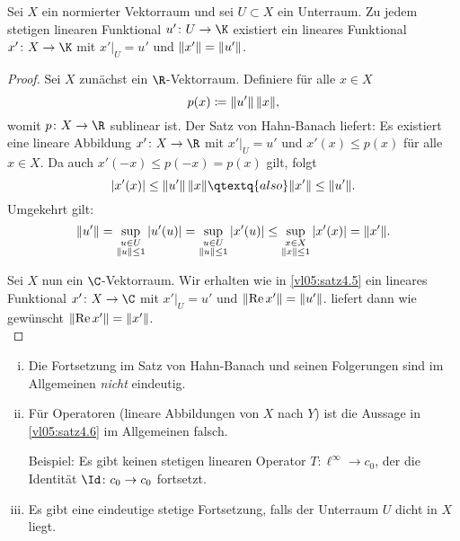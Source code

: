 \begin{thSatz} \label{vl05:satz4.6}
    Sei $X$ ein normierter Vektorraum und sei $U\subset X$ ein Unterraum. Zu
    jedem stetigen linearen Funktional $u'\colon U\to\K$ existiert ein lineares
    Funktional $x'\colon X\to\K$ mit $x'\vert_U = u'$ und $\lVert x'\rVert=\lVert u'\rVert$.
\end{thSatz}

\begin{proof}
    Sei $X$ zunächst ein $\R$-Vektorraum. Definiere für alle $x\in X$
    \[ p(x) \defeq \norm*{u'} \, \norm{x}  , \]
    womit $p\colon X\to\R$ sublinear ist. Der Satz von Hahn-Banach
     liefert: Es existiert eine lineare Abbildung
    $x'\colon X\to\R$ mit $x'\vert_U = u'$ und $x'(x) \leq p(x)$ für alle
    $x\in X$. Da auch $x'(-x) \leq p(-x) = p(x)$ gilt, folgt
    \[ \abs*{x'(x)}\leq \norm*{u'} \, \norm{x}  \qtextq{also}
        \norm*{x'}\leq\norm*{u'}
    . \]
    Umgekehrt gilt:
    \[ \norm*{u'} = \sup_{\substack{u\in U\\\norm{u}\leq1}} \, \abs*{u'(u)}
        = \sup_{\substack{u\in U\\\norm{u}\leq1}}           \, \abs*{x'(u)}
        \leq \sup_{\substack{x\in X\\\norm{x}\leq1}}        \, \abs*{x'(x)}
        = \norm*{x'}
    . \]
    
    Sei $X$ nun ein $\C$-Vektorraum. Wir erhalten wie in \cref{vl05:satz4.5}
    ein lineares Funktional $x'\colon X\to\C$ mit $x'\vert_U = u'$ und 
    $\norm*{\Re x'} = \norm*{u'}$.  liefert dann
    wie gewünscht $\norm*{\Re x'} = \norm*{x'}$.
    \\
\end{proof}

\begin{thBemerkung}\hfill
    \begin{enumerate}[i)]
        \item
            Die Fortsetzung im Satz von Hahn-Banach 
            und seinen Folgerungen sind im Allgemeinen \emph{nicht} eindeutig.
        \item
            Für Operatoren (lineare Abbildungen von $X$ nach $Y$) ist die
            Aussage in \cref{vl05:satz4.6} im Allgemeinen falsch.
            
            Beispiel: Es gibt keinen stetigen linearen Operator
            $T\colon\ell^\infty\to c_0$, der die Identität $\Id\colon c_0\to
            c_0$ fortsetzt.
        \item
            Es gibt eine eindeutige stetige Fortsetzung, falls der Unterraum
            $U$ dicht in $X$ liegt.
    \end{enumerate}
\end{thBemerkung}

